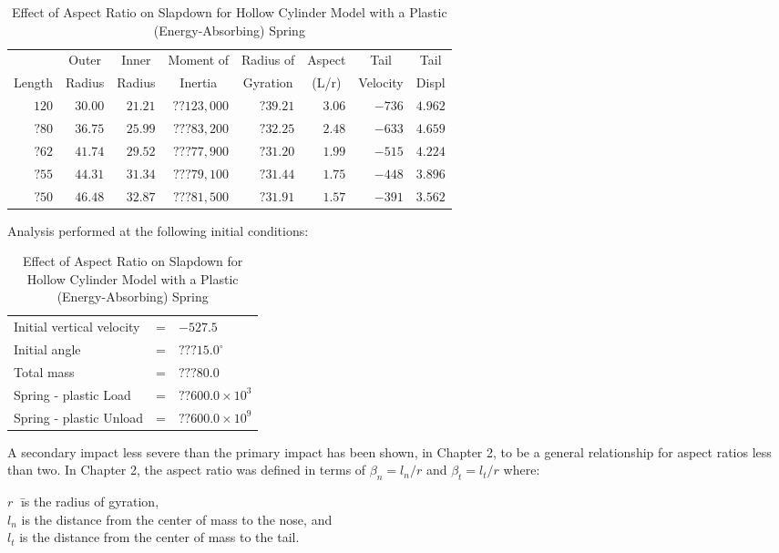 \begin{table}
\begin{center}
\caption{Effect of Aspect Ratio on Slapdown for Hollow Cylinder Model
with a Plastic (Energy-Absorbing) Spring}
\makeqnum
\begin{tabular}{||r|r|r|r|r|r|r|r||}
\hline
&\multicolumn{1}{c|}{Outer}
&\multicolumn{1}{c|}{Inner}
&\multicolumn{1}{c|}{Moment of}
&\multicolumn{1}{c|}{Radius of}
&\multicolumn{1}{c|}{Aspect}
&\multicolumn{1}{c|}{Tail}
&\multicolumn{1}{c||}{Tail}\\
\multicolumn{1}{||c|}{Length}
&\multicolumn{1}{c|}{Radius}
&\multicolumn{1}{c|}{Radius}
&\multicolumn{1}{c|}{Inertia}
&\multicolumn{1}{c|}{Gyration}
&\multicolumn{1}{c|}{(L/r)}
&\multicolumn{1}{c|}{Velocity}
&\multicolumn{1}{c||}{Displ}\\
\hline
$120$ &$30.00$ &$21.21$ &$??123,000$ &$?39.21$ &$3.06$ &$-736$
&$4.962$\\
$?80$ &$36.75$ &$25.99$ &$???83,200$ &$?32.25$ &$2.48$ &$-633$
&$4.659$\\
$?62$ &$41.74$ &$29.52$ &$???77,900$ &$?31.20$ &$1.99$ &$-515$
&$4.224$\\
$?55$ &$44.31$ &$31.34$ &$???79,100$ &$?31.44$ &$1.75$ &$-448$
&$3.896$\\
$?50$ &$46.48$ &$32.87$ &$???81,500$ &$?31.91$ &$1.57$ &$-391$
&$3.562$\\
\hline
\end{tabular}
\end{center}

Analysis performed at the following initial conditions:

\makeqnum
\begin{tabular}{lll}
Initial vertical velocity &=  &$-527.5$\\
Initial angle             &=  &$???15.0^\circ$\\
Total mass                &=  &$???80.0$\\
Spring - plastic     Load &=  &$??600.0\times10^3$\\
Spring - plastic   Unload &=  &$??600.0\times10^9$\\
\end{tabular}
\end{table}

     A secondary impact less severe than the primary impact has been
shown, in Chapter 2,
to be a general relationship for aspect ratios less than two.  In
Chapter 2, the aspect ratio was defined in terms of $\beta_{n} =
l_{n}/r$ and $\beta_{t} = l_{t}/r$ where:
\begin{tabbing}
$r  \;$ \= is the radius of gyration,\\
$l_{n}$ \> is the distance from the center of mass to the nose, and\\
$l_{t}$ \> is the distance from the center of mass to the tail.\\
\end{tabbing}

